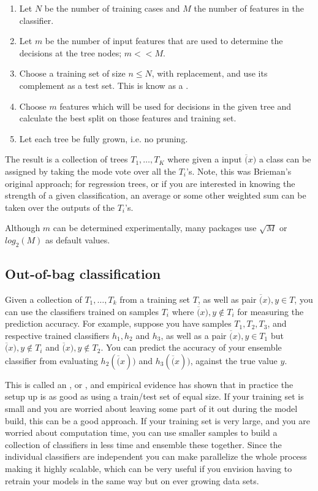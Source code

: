 \begin{enumerate}
    \item Let $N$ be the number of training cases and $M$ the number of features in the classifier. 
    \item Let $m$ be the number of input features that are used to determine the decisions at the tree nodes; $m<<M$. 
    \item Choose a training set of size $n \leq N$, with replacement, and use its complement as a test set. This is know as a .
    \item Choose $m$ features which will be used for decisions in the given tree and calculate the best split on those features and training set. 
    \item Let each tree be fully grown, i.e. no pruning. 
\end{enumerate}

The result is a collection of trees $T_{1}, \dots , T_{K}$ where given a input $\overline(x)$ a class can be assigned by taking the mode vote over all the $T_{i}$'s. Note, this was Brieman's original approach; for regression trees, or if you are interested in knowing the strength of a given classification, an average or some other weighted sum can be taken over the outputs of the $T_{i}$'s.


Although $m$ can be determined experimentally, many packages use $\sqrt{M}$ or $log_2(M)$ as default values. 



\subsection{Out-of-bag classification}


Given a collection of  $T_{1}, \dots, T_{k}$ from a training set $T$, as well as pair $\overline(x), y \in T$, you can use the classifiers trained on samples $T_i$ where  $\overline(x), y \notin T_i$ for measuring the prediction accuracy. For example, suppose you have samples $T_{1}, T_{2}, T_{3}$, and respective trained classifiers $h_{1}, h_{2}$ and $h_{3}$, as well as a pair  $\overline(x), y \in T_{1}$ but  $\overline(x), y \notin T_i$ and  $\overline(x), y \notin T_2$. You can predict the accuracy of your ensemble classifier from evaluating $h_{2}(\overline(x))$ and $h_{3}(\overline(x))$, against the true value $y$. 



This is called an , or , and empirical evidence has shown that in practice the setup up is as good as using a train/test set of equal size. If your training set is small and you are worried about leaving some part of it out during the model build, this can be a good approach. If your training set is very large, and you are worried about computation time, you can use smaller  samples to build a collection of classifiers in less time and ensemble these together. Since the individual classifiers are independent you can make parallelize the whole process making it highly scalable, which can be very useful if you envision having to retrain your models in the same way but on ever growing data sets.  



